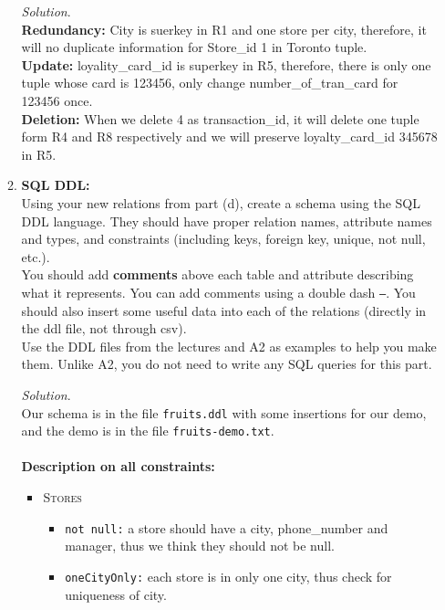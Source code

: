 \documentclass[10pt]{article}
\begin{document}
\begin{enumerate}
\begin{enumerate}
        \begin{mdframed}[leftmargin=-6.5mm]
        \textit{Solution}.\\
        \textbf{Redundancy:} City is suerkey in R1 and one store per city, therefore, it will no duplicate information for Store\_id 1 in Toronto tuple.\\
        \textbf{Update:} loyality\_card\_id is superkey in R5, therefore, there is only one tuple whose card is 123456, only change number\_of\_tran\_card for 123456 once.\\
        \textbf{Deletion:} When we delete 4 as transaction\_id, it will delete one tuple form R4 and R8 respectively and we will preserve loyalty\_card\_id 345678 in R5.
        \end{mdframed}
        
        \item \textbf{SQL DDL:}\\
        Using your new relations from part (d), create a schema using the SQL DDL language. They should have proper relation names, attribute names and types, and constraints (including keys, foreign key, unique, not null, etc.).\\
        You should add \textbf{comments} above each table and attribute describing what it represents. You can add comments using a double dash \texttt{--}. You should also insert some useful data into each of the relations (directly in the ddl file, not through csv).\\
        Use the DDL files from the lectures and A2 as examples to help you make them. Unlike A2, you do not need to write any SQL queries for this part.
        
        \begin{mdframed}[leftmargin=-6.5mm]
        \textit{Solution}.\\
        Our schema is in the file \texttt{fruits.ddl} with some insertions for our demo,\\
        and the demo is in the file \texttt{fruits-demo.txt}.
        \\
        \\
        \textbf{Description on all constraints: }
        \begin{itemize}
            \item \textsc{Stores}
            \begin{itemize}
                \item \texttt{not null:} a store should have a city, phone\_number and manager, thus we think they should not be null.
                \item \texttt{oneCityOnly:} each store is in only one city, thus check for uniqueness of city.
            \end{itemize}
            

\end{itemize}
\end{mdframed}
\end{enumerate}
\end{enumerate}
\end{document}
